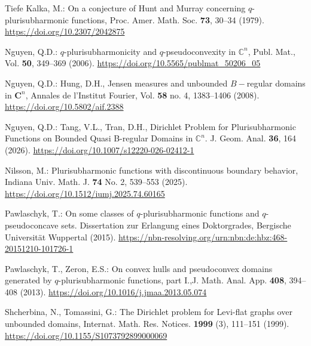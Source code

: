 \documentclass[reqno]{amsart}
\theoremstyle{definition}
\numberwithin{equation}{section}
\newcommand{\cbb}{\mathbb{C}}
\begin{document}
\begin{thebibliography}{Tiefe}
Kalka, M.: On a conjecture of Hunt and Murray concerning $q$-plurisubharmonic functions, Proc. Amer. Math. Soc. \textbf{73}, 30--34 (1979). \href{https://doi.org/10.2307/2042875}{https://doi.org/10.2307/2042875}

Nguyen, Q.D.: $q$-plurisubharmonicity and $q$-pseudoconvexity in $\cbb^n$, Publ. Mat., Vol. \textbf{50}, 349--369 (2006). \href{https://doi.org/10.5565/publmat\_50206\_05}{https://doi.org/10.5565/publmat\_50206\_05}

Nguyen, Q.D.: Hung, D.H., Jensen measures and unbounded $B-$regular domains in ${\mathbf{C}}^n$, Annales de l'Institut Fourier, Vol. \textbf{58} no. 4, 1383--1406 (2008). \href{https://doi.org/10.5802/aif.2388}{https://doi.org/10.5802/aif.2388}

Nguyen, Q.D.: Tang, V.L., Tran, D.H., Dirichlet Problem for Plurisubharmonic Functions on Bounded Quasi B-regular Domains in $\cbb^n$. J. Geom. Anal. \textbf{36}, 164 (2026). \href{https://doi.org/10.1007/s12220-026-02412-1}{https://doi.org/10.1007/s12220-026-02412-1}


Nilsson, M.: Plurisubharmonic functions with discontinuous boundary behavior, Indiana Univ. Math. J. \textbf{74} No. 2, 539–553 (2025). \href{https://doi.org/10.1512/iumj.2025.74.60165}{https://doi.org/10.1512/iumj.2025.74.60165}


Pawlaschyk, T.: On some classes of $q$-plurisubharmonic functions and $q$-pseudoconcave sets. Dissertation zur Erlangung eines Doktorgrades, Bergische Universit\"at Wuppertal (2015). \href{https://nbn-resolving.org/urn:nbn:de:hbz:468-20151210-101726-1}{https://nbn-resolving.org/urn:nbn:de:hbz:468-20151210-101726-1}

Pawlaschyk, T., Zeron, E.S.: On convex hulls and pseudoconvex domains generated by $q$-plurisubharmonic functions, part I.,J. Math. Anal. App. \textbf{408}, 394--408 (2013). \href{https://doi.org/10.1016/j.jmaa.2013.05.074}{https://doi.org/10.1016/j.jmaa.2013.05.074}

Shcherbina, N., Tomassini, G.: The Dirichlet problem for Levi-flat graphs over unbounded domains, Internat. Math. Res. Notices. \textbf{1999} (3), 111--151 (1999). \href{https://doi.org/10.1155/S1073792899000069}{https://doi.org/10.1155/S1073792899000069}


\end{thebibliography}
\end{document}
